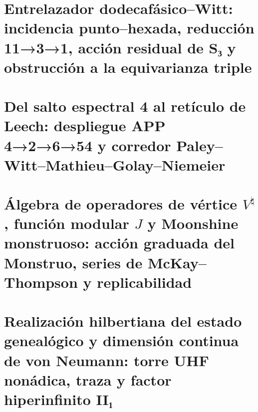 \chapter{Entrelazador dodecafásico–Witt: incidencia punto–hexada, reducción 11→3→1, acción residual de S₃ y obstrucción a la equivarianza triple}
\label{chap:sucesor-102-20}
\begin{HMTScientificOwnerSubordinated}

\end{HMTScientificOwnerSubordinated}

\chapter{Del salto espectral 4 al retículo de Leech: despliegue APP 4→2→6→54 y corredor Paley–Witt–Mathieu–Golay–Niemeier}
\label{chap:sucesor-102-21}

\begin{HMTScientificOwnerSubordinated}


\end{HMTScientificOwnerSubordinated}


\chapter{Álgebra de operadores de vértice \texorpdfstring{\(V^\natural\)}{V^♮}, función modular \texorpdfstring{\(J\)}{J} y Moonshine monstruoso: acción graduada del Monstruo, series de McKay–Thompson y replicabilidad}
\label{chap:sucesor-102-22}
\label{chap:voa-moonshine-rector}






\chapter{Realización hilbertiana del estado genealógico y dimensión continua de von Neumann: torre UHF nonádica, traza y factor hiperinfinito II₁}
\label{chap:sucesor-102-23}


